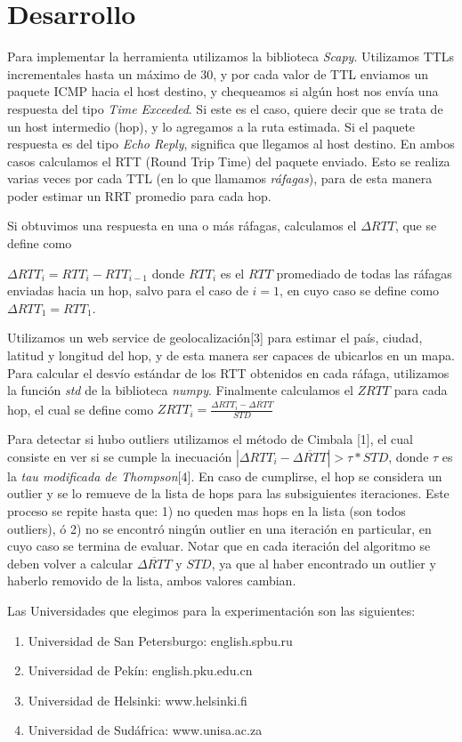 \section{Desarrollo}

Para implementar la herramienta utilizamos la biblioteca \textit{Scapy}. Utilizamos TTLs incrementales hasta un máximo de 30, y por cada valor de TTL enviamos un paquete ICMP hacia el host destino, y chequeamos si algún host nos envía una respuesta del tipo \textit{Time Exceeded}. Si este es el caso, quiere decir que se trata de un host intermedio (hop), y lo agregamos a la ruta estimada. Si el paquete respuesta es del tipo \textit{Echo Reply}, significa que llegamos al host destino. En ambos casos calculamos el RTT (Round Trip Time) del paquete enviado. Esto se realiza varias veces por cada TTL (en lo que llamamos \textit{ráfagas}), para de esta manera poder estimar un RRT promedio para cada hop.

Si obtuvimos una respuesta en una o más ráfagas, calculamos el $\Delta RTT$, que se define como

$\Delta RTT_{i} = RTT_{i} - RTT_{i-1}$ donde $RTT_{i}$ es el $RTT$ promediado de todas las ráfagas enviadas hacia un hop, salvo para el caso de 
$i = 1$, en cuyo caso se define como $\Delta RTT_{1} = RTT_{1}$.

Utilizamos un web service de geolocalización[3] para estimar el país, ciudad, latitud y longitud del hop, y de esta manera ser capaces de ubicarlos en un mapa. Para calcular el desvío estándar de los RTT obtenidos en cada ráfaga, utilizamos la función \textit{std} de la biblioteca \textit{numpy}.
Finalmente calculamos el $ZRTT$ para cada hop, el cual se define como $ZRTT_{i} = \frac{\Delta RTT_{i} - \overline{\Delta RTT}}{STD}$

Para detectar si hubo outliers utilizamos el método de Cimbala [1], el cual consiste en ver si se cumple la inecuación $|\Delta RTT_{i} - \overline{\Delta RTT}| > \tau * STD$, donde $\tau$ es la \textit{tau modificada de Thompson}[4]. En caso de cumplirse, el hop se considera un outlier y se lo remueve de la lista de hops para las subsiguientes iteraciones. Este proceso se repite hasta que: 1) no queden mas hops en la lista (son todos outliers), ó 2) no se encontró ningún outlier en una iteración en particular, en cuyo caso se termina de evaluar. Notar que en cada iteración del algoritmo se deben volver a calcular $\overline{\Delta RTT}$ y $STD$, ya que al haber encontrado un outlier y haberlo removido de la lista, ambos valores cambian.

Las Universidades que elegimos para la experimentación son las siguientes:

\begin{enumerate}
	\item Universidad de San Petersburgo: english.spbu.ru
	\item Universidad de Pekín: english.pku.edu.cn
	\item Universidad de Helsinki: www.helsinki.fi
	\item Universidad de Sudáfrica: www.unisa.ac.za
\end{enumerate}
